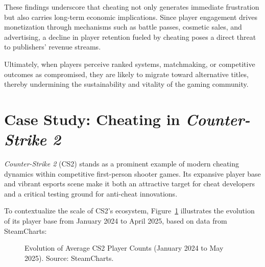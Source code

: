 These findings underscore that cheating not only generates immediate frustration but also carries long-term economic implications. Since player engagement drives monetization through mechanisms such as battle passes, cosmetic sales, and advertising, a decline in player retention fueled by cheating poses a direct threat to publishers' revenue streams.

Ultimately, when players perceive ranked systems, matchmaking, or competitive outcomes as compromised, they are likely to migrate toward alternative titles, thereby undermining the sustainability and vitality of the gaming community.

\section{Case Study: Cheating in \textit{Counter-Strike 2}}

\textit{Counter-Strike 2} (CS2) stands as a prominent example of modern cheating dynamics within competitive first-person shooter games. Its expansive player base and vibrant esports scene make it both an attractive target for cheat developers and a critical testing ground for anti-cheat innovations.

To contextualize the scale of CS2's ecosystem, Figure~\ref{fig:cs2-playerbase} illustrates the evolution of its player base from January 2024 to April 2025, based on data from SteamCharts:

\begin{figure}[H]
  \centering
  \caption{Evolution of Average CS2 Player Counts (January 2024 to May 2025). Source: SteamCharts.}
  \label{fig:cs2-playerbase}
\end{figure}

